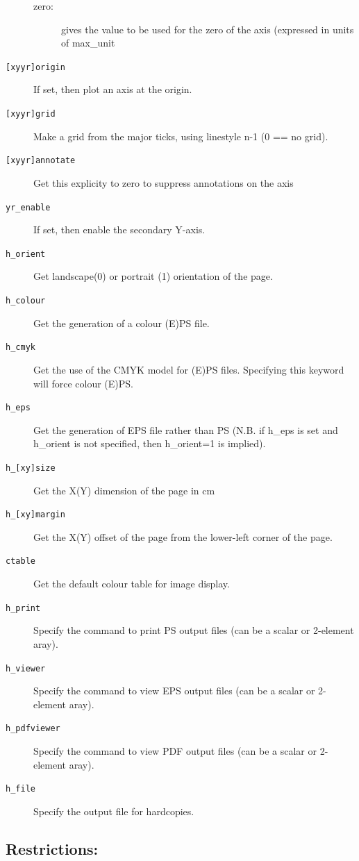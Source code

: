 \documentclass[11pt,twoside,english]{article}
\begin{document}
\begin{description}
\begin{description}
     \item [zero:] gives the value to be used for
       the zero of the axis (expressed in
       units of  max\_unit	
     \end{description}
   \item[\texttt{[xyyr]origin}]	If set, then plot an axis at the origin.
   \item[\texttt{[xyyr]grid}]   Make a grid from the major ticks,
     using linestyle n-1 (0 == no grid).
   \item[\texttt{[xyyr]annotate}]	Get this explicity to zero to suppress
     annotations on the axis
   \item[\texttt{yr\_enable}]	If set, then enable the secondary Y-axis.
   \item[\texttt{h\_orient}]	Get landscape(0) or portrait (1)
     orientation of the page.
   \item[\texttt{h\_colour}]	Get  the generation of a
     colour (E)PS file.
   \item[\texttt{h\_cmyk}]	Get  the use of the CMYK model
     for (E)PS files. Specifying this
     keyword will force colour (E)PS.
   \item[\texttt{h\_eps}]	Get  the generation of EPS
     file rather than PS (N.B. if h\_eps is
     set and h\_orient is not specified,
     then h\_orient=1 is implied).
   \item[\texttt{h\_[xy]size}]	Get the X(Y) dimension of the page in cm
   \item[\texttt{h\_[xy]margin}]	Get the X(Y) offset of the page from
     the lower-left corner of the page.
   \item[\texttt{ctable}]	Get the default colour table for image display.
   \item[\texttt{h\_print}]	Specify the command to print PS output
     files (can be a scalar or 2-element aray).
   \item[\texttt{h\_viewer}]	Specify the command to view EPS output
     files (can be a scalar or 2-element aray).
   \item[\texttt{h\_pdfviewer}]	Specify the command to view PDF output
     files (can be a scalar or 2-element aray).
   \item[\texttt{h\_file}]	Specify the output file for hardcopies.
 \end{description}
				
 \subsection{Restrictions:}
 \label{sec:gi-restrictions}
\end{document}
